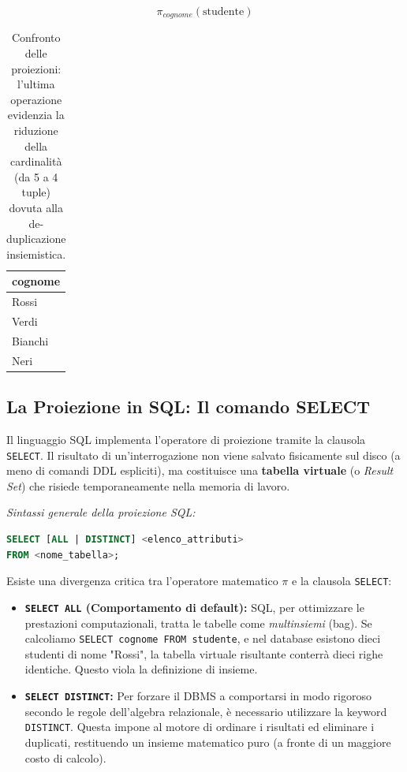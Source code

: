 \begin{example}
\begin{table}[H]
\begin{minipage}{0.28\textwidth}
            \centering
            $$ \pi_{cognome}(\text{studente}) $$
            \vspace{0.1cm}
            \renewcommand{\arraystretch}{1.2}
            \begin{tabular}{l}
                \toprule
                \textbf{cognome} \\
                \midrule
                Rossi   \\
                Verdi   \\
                Bianchi \\
                Neri    \\
                \bottomrule
            \end{tabular}
        \end{minipage}
        
        \vspace{0.3cm}
        \caption{Confronto delle proiezioni: l'ultima operazione evidenzia la riduzione della cardinalità (da 5 a 4 tuple) dovuta alla de-duplicazione insiemistica.}
        \label{tab:esempi_proiezioni}
    \end{table}
\end{example}


\subsection{La Proiezione in SQL: Il comando SELECT}

Il linguaggio SQL implementa l'operatore di proiezione tramite la clausola \texttt{SELECT}. Il risultato di un'interrogazione non viene salvato fisicamente sul disco (a meno di comandi DDL espliciti), ma costituisce una \textbf{tabella virtuale} (o \textit{Result Set}) che risiede temporaneamente nella memoria di lavoro.

\textit{Sintassi generale della proiezione SQL:}
\begin{lstlisting}[language=SQL, basicstyle=\ttfamily\small, keywordstyle=\color{blue}\bfseries]
SELECT [ALL | DISTINCT] <elenco_attributi>
FROM <nome_tabella>;
\end{lstlisting}

Esiste una divergenza critica tra l'operatore matematico $\pi$ e la clausola \texttt{SELECT}:
\begin{itemize}
    \item \textbf{\texttt{SELECT ALL} (Comportamento di default):} SQL, per ottimizzare le prestazioni computazionali, tratta le tabelle come \textit{multinsiemi} (bag). Se calcoliamo \texttt{SELECT cognome FROM studente}, e nel database esistono dieci studenti di nome "Rossi", la tabella virtuale risultante conterrà dieci righe identiche. Questo viola la definizione di insieme.
    \item \textbf{\texttt{SELECT DISTINCT}:} Per forzare il DBMS a comportarsi in modo rigoroso secondo le regole dell'algebra relazionale, è necessario utilizzare la keyword \texttt{DISTINCT}. Questa impone al motore di ordinare i risultati ed eliminare i duplicati, restituendo un insieme matematico puro (a fronte di un maggiore costo di calcolo).
\end{itemize}

